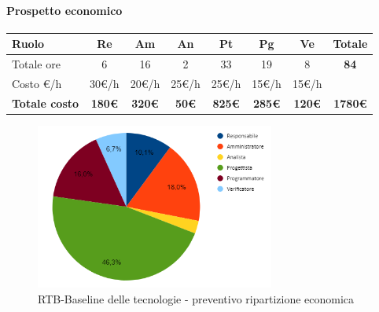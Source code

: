 \paragraph{Prospetto economico}
\begin{center}
	\renewcommand{\arraystretch}{1.8} %
	\begin{tabular}{ |m{10em}|c|c|c|c|c|c|c| }
	\hline
	\textbf{Ruolo} & \textbf{Re} & \textbf{Am} &  \textbf{An} &  \textbf{Pt} &  \textbf{Pg} &  \textbf{Ve} &  \textbf{Totale}\\
    \hline
    Totale ore & 6 & 16 & 2 & 33 & 19 & 8 & \textbf{84}\\
    \hline
    Costo \euro/h & 30\euro/h & 20\euro/h & 25\euro/h & 25\euro/h & 15\euro/h & 15\euro/h & \\
    \hline
    \textbf{Totale costo} & \textbf{180\euro} & \textbf{320\euro} &  \textbf{50\euro} &  \textbf{825\euro} &  \textbf{285\euro} &  \textbf{120\euro} &  \textbf{1780\euro}\\
    \hline
	\end{tabular}

    \begin{figure}[H]
        \centering\includegraphics[width=0.7\textwidth, height=0.7\textheight, keepaspectratio]{images/preventivo/RTB-tecnologico-costo.png}
        \caption{RTB-Baseline delle tecnologie - preventivo ripartizione economica}
    \end{figure}
    
\end{center}

\newpage